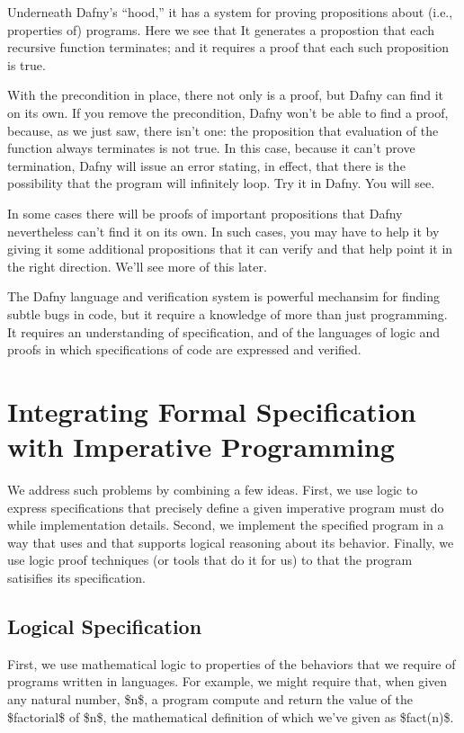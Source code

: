 \documentclass[letterpaper,10pt,english]{sphinxmanual}
\begin{document}
Underneath Dafny’s “hood,” it has a system for proving propositions
about (i.e., properties of) programs. Here we see that It generates a
propostion that each recursive function terminates; and it requires a
proof that each such proposition is true.

With the precondition in place, there not only is a proof, but Dafny
can find it on its own. If you remove the precondition, Dafny won’t be
able to find a proof, because, as we just saw, there isn’t one: the
proposition that evaluation of the function always terminates is not
true. In this case, because it can’t prove termination, Dafny will
issue an error stating, in effect, that there is the possibility that
the program will infinitely loop. Try it in Dafny.  You will see.

In some cases there will be proofs of important propositions that
Dafny nevertheless can’t find it on its own. In such cases, you may
have to help it by giving it some additional propositions that it
can verify and that help point it in the right direction. We’ll see
more of this later.

The Dafny language and verification system is powerful mechansim for
finding subtle bugs in code, but it require a knowledge of more than
just programming. It requires an understanding of specification, and
of the languages of logic and proofs in which specifications of code
are expressed and verified.


\chapter{Integrating Formal Specification with Imperative Programming}
\label{\detokenize{05-putting-it-together::doc}}\label{\detokenize{05-putting-it-together:integrating-formal-specification-with-imperative-programming}}
We address such problems by combining a few ideas. First, we use logic
to express  specifications that precisely define  a
given imperative program must do while 
implementation details. Second, we implement the specified program in
a way that uses and that supports logical reasoning about its
behavior. Finally, we use logic proof techniques (or tools that do it
for us) to  that the program satisifies its specification.


\section{Logical Specification}
\label{\detokenize{05-putting-it-together:logical-specification}}
First, we use mathematical logic to  properties
of the behaviors that we require of programs written in 
languages. For example, we might require that, when given any natural
number, \$n\$, a program compute and return the value of the \$factorial\$
of \$n\$, the mathematical definition of which we’ve given as \$fact(n)\$.
\end{document}
